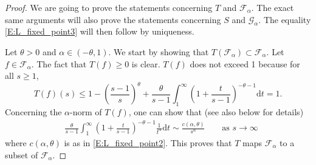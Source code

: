 \documentclass[11pt]{article}
\theoremstyle{remark}
\newcommand{\Fc}{\mathcal{F}}
\newcommand{\Gc}{\mathcal{G}}
\renewcommand{\d}{\mathrm{d}}
\numberwithin{equation}{section}
\begin{document}
\begin{proof}
We are going to prove the statements concerning $T$ and $\Fc_\alpha$. The exact same arguments will also prove the statements concerning $S$ and $\Gc_\alpha$. The equality \eqref{E:L_fixed_point3} will then follow by uniqueness.

Let $\theta >0$ and $\alpha \in (-\theta,1)$.
We start by showing that $T(\Fc_\alpha) \subset \Fc_\alpha$. Let $f \in \Fc_\alpha$. The fact that $T(f) \geq 0$ is clear. $T(f)$ does not exceed 1 because for all $s \geq 1$,
\[
T(f)(s) \leq 1 - \left( \frac{s-1}{s} \right)^\theta + \frac{\theta}{s-1} \int_1^\infty \left( 1 + \frac{t}{s-1} \right)^{-\theta-1} \d t = 1.
\]
Concerning the $\alpha$-norm of $T(f)$, one can show that (see also below for details)
\begin{align*}
& \frac{\theta}{s-1} \int_1^\infty \left( 1 + \frac{t}{s-1} \right)^{-\theta -1} \frac{1}{t^\alpha} \d t
\sim \frac{c(\alpha,\theta)}{s^{\alpha}}
\quad \quad \text{as~} s \to \infty
\end{align*}
where $c(\alpha,\theta)$ is as in \eqref{E:L_fixed_point2}. This proves that $T$ maps $\Fc_\alpha$ to a subset of $\Fc_\alpha$.


\end{proof}
\end{document}
